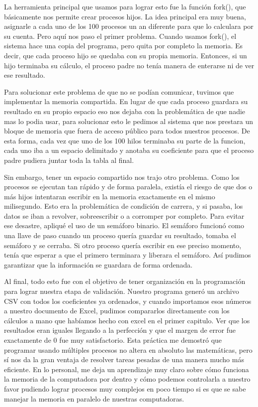La herramienta principal que usamos para lograr esto fue la función fork(), que básicamente nos permite crear procesos hijos. La idea principal era muy buena, asignarle a cada uno de los 100 procesos un an diferente para que lo calculara por su cuenta. Pero aquí nos paso el primer problema. Cuando usamos fork(), el sistema hace una copia del programa, pero quita por completo la memoria. Es decir, que cada proceso hijo se quedaba con su propia memoria. Entonces, si un hijo terminaba su cálculo, el proceso padre no tenía manera de enterarse ni de ver ese resultado.

Para solucionar este problema de que no se podían comunicar, tuvimos que implementar la memoria compartida. En lugar de que cada proceso guardara su resultado en su propio espacio eso nos dejaba con la problemática de que nadie mas lo podia usar, para solucionar esto le pedimos al sistema que nos prestara un bloque de memoria que fuera de acceso público para todos nuestros procesos.  De esta forma, cada vez que uno de los 100 hilos terminaba su parte de la funcion,  cada uno iba a un espacio delimitado y anotaba su coeficiente para que el proceso padre pudiera juntar toda la tabla al final.

Sin embargo, tener un espacio compartido nos trajo otro problema. Como los procesos se ejecutan tan rápido y de forma paralela, existía el riesgo de que dos o más hijos intentaran escribir en la memoria exactamente en el mismo milisegundo. Esto era la problemática de condición de carrera, y si pasaba, los datos se iban a revolver, sobreescribir o a corromper por completo. Para evitar ese desastre, apliqué el uso de un semáforo binario. El semáforo funcionó como una llave de paso cuando un proceso quería guardar su resultado, tomaba el semáforo y se cerraba. Si otro proceso quería escribir en ese preciso momento, tenía que esperar a que el primero terminara y liberara el semáforo. Así pudimos garantizar que la información se guardara de forma ordenada.

Al final, todo esto fue con el objetivo de tener organización en la programación para lograr nuestra etapa de validación. Nuestro programa generó un archivo CSV con todos los coeficientes ya ordenados, y cuando importamos esos números a nuestro documento de Excel, pudimos compararlos directamente con los cálculos a mano que habíamos hecho con excel en el primer capitulo. Ver que los resultados eran iguales llegando a la perfección y que el margen de error fue exactamente de 0 fue muy satisfactorio. Esta práctica me demostró que programar usando múltiples procesos no altera en absoluto las matemáticas, pero sí nos da la gran ventaja de resolver tareas pesadas de una manera mucho más eficiente. En lo personal, me deja un aprendizaje muy claro sobre cómo funciona la memoria de la computadora por dentro y cómo podemos controlarla a nuestro favor pudiendo lograr procesos muy complejos en poco tiempo si es que se sabe manejar la memoria en paralelo de nuestras computadoras.
\clearpage
